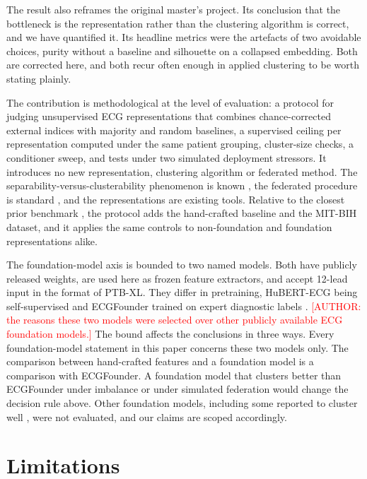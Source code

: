 \documentclass[preprint,11pt]{elsarticle}
\begin{document}
The result also reframes the original master's project. Its conclusion that the
bottleneck is the representation rather than the clustering algorithm is correct, and we
have quantified it. Its headline metrics were the artefacts of two avoidable choices,
purity without a baseline and silhouette on a collapsed embedding. Both are corrected
here, and both recur often enough in applied clustering to be worth stating plainly.

The contribution is methodological at the level of evaluation: a protocol for judging
unsupervised ECG representations that combines chance-corrected external indices with
majority and random baselines, a supervised ceiling per representation computed under the
same patient grouping, cluster-size checks, a conditioner sweep, and tests under two
simulated deployment stressors. It introduces no new representation, clustering algorithm
or federated method. The separability-versus-clusterability phenomenon is
known \cite{sslclustering2025}, the federated procedure is standard \cite{fedavg2017},
and the representations are existing tools. Relative to the closest prior benchmark
\cite{lookingbeyond2026}, the protocol adds the hand-crafted baseline and the MIT-BIH
dataset, and it applies the same controls to non-foundation and foundation
representations alike.

The foundation-model axis is bounded to two named models. Both have publicly released
weights, are used here as frozen feature extractors, and accept 12-lead input in the
format of PTB-XL. They differ in pretraining, HuBERT-ECG being self-supervised and
ECGFounder trained on expert diagnostic labels \cite{hubertecg2024,ecgfounder2024}.
\textcolor{red}{[AUTHOR: the reasons these two models were selected over other publicly
available ECG foundation models.]} The bound affects the conclusions in three ways. Every
foundation-model statement in this paper concerns these two models only. The comparison
between hand-crafted features and a foundation model is a comparison with ECGFounder. A
foundation model that clusters better than ECGFounder under imbalance or under simulated
federation would change the decision rule above. Other foundation models, including some
reported to cluster well \cite{lookingbeyond2026}, were not evaluated, and our claims are
scoped accordingly.

\section{Limitations}\label{sec:limitations}
\end{document}
